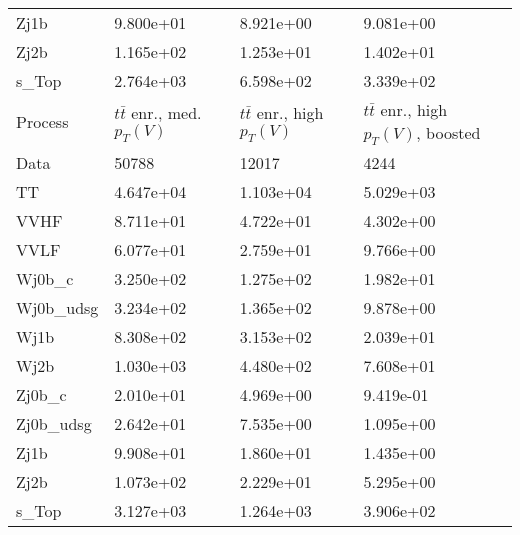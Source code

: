 \begin{table}
{\begin{tabularx}{0.8\textwidth}{|X|X|X|X|}
Zj1b & 9.800e+01 & 8.921e+00 & 9.081e+00 \\
Zj2b & 1.165e+02 & 1.253e+01 & 1.402e+01 \\
s\_Top & 2.764e+03 & 6.598e+02 & 3.339e+02 \\
\hline
\hline
Process & $t\bar{t}$ enr., med. $p_{T}(V)$ & $t\bar{t}$ enr., high $p_{T}(V)$ & $t\bar{t}$ enr., high $p_{T}(V)$, boosted \\
\hline
Data & 50788 & 12017 & 4244 \\
\hline
TT & 4.647e+04 & 1.103e+04 & 5.029e+03 \\
VVHF & 8.711e+01 & 4.722e+01 & 4.302e+00 \\
VVLF & 6.077e+01 & 2.759e+01 & 9.766e+00 \\
Wj0b\_c & 3.250e+02 & 1.275e+02 & 1.982e+01 \\
Wj0b\_udsg & 3.234e+02 & 1.365e+02 & 9.878e+00 \\
Wj1b & 8.308e+02 & 3.153e+02 & 2.039e+01 \\
Wj2b & 1.030e+03 & 4.480e+02 & 7.608e+01 \\
Zj0b\_c & 2.010e+01 & 4.969e+00 & 9.419e-01 \\
Zj0b\_udsg & 2.642e+01 & 7.535e+00 & 1.095e+00 \\
Zj1b & 9.908e+01 & 1.860e+01 & 1.435e+00 \\
Zj2b & 1.073e+02 & 2.229e+01 & 5.295e+00 \\
s\_Top & 3.127e+03 & 1.264e+03 & 3.906e+02 \\
\hline
\end{tabularx}
}
\label{tab:cr-Wmn-2016}
\end{table}

